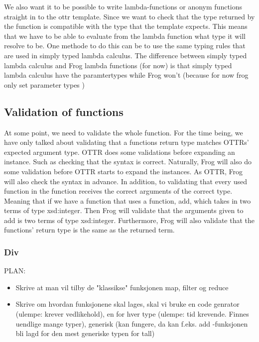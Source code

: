 \para
We also want it to be possible to write lambda-functions or anonym functions straight in to the ottr template. Since we want to check that 
the type returned by the function is compatible with the type that the template expects. This means that we have to be able to evaluate from 
the lambda function what type it will resolve to be. One methode to do this can be to use the same typing rules that are used in 
simply typed lambda calculus. The difference between simply typed lambda calculus and Frog lambda functions (for now) is that simply typed 
lambda calculus have the paramtertypes while Frog won't (because for now frog only set parameter types )  

\subsection{Validation of functions}
At some point, we need to validate the whole function. For the time being, we have only talked about validating that a functions return type matches OTTRs' expected argument type.  OTTR does some validations before expanding an instance. Such as checking that the syntax is correct. Naturally, Frog will also do some validation before OTTR starts to expand the instances. As OTTR, Frog will also check the syntax in advance. In addition, to validating that every used function in the function receives the correct arguments of the correct type. Meaning that if we have a function that uses a function, add, which takes in two terms of type xsd:integer. Then Frog will validate that the arguments given to add is two terms of type xsd:integer. Furthermore, Frog will also validate that the functions' return type is the same as the returned term.

\subsubsection{Div}
PLAN:
\begin{itemize}
    \item Skrive at man vil tilby de "klassikse" funksjonen map, filter og reduce
    \item Skrive om hvordan funksjonene skal lages, skal vi bruke en code genrator (ulempe: krever vedlikehold), en for hver type (ulempe: tid krevende. Finnes uendlige mange typer), generisk (kan fungere, da kan f.eks. add -funksjonen bli lagd for den mest generiske typen for tall)
\end{itemize}

